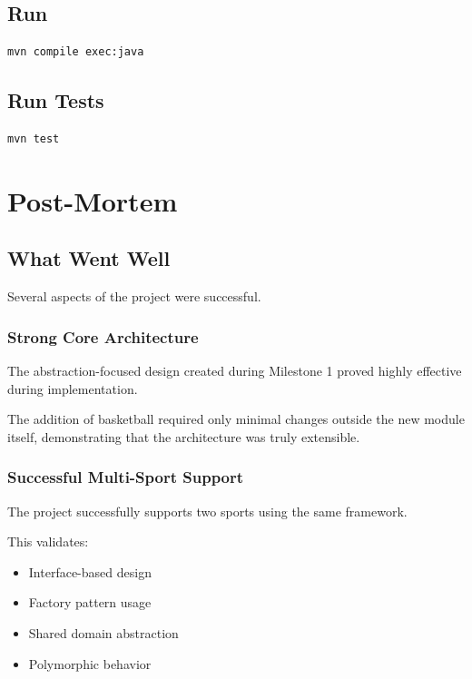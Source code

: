 \documentclass[11pt,a4paper]{article}
\begin{document}
\subsection*{Run}

\begin{verbatim}
mvn compile exec:java
\end{verbatim}

\subsection*{Run Tests}

\begin{verbatim}
mvn test
\end{verbatim}

\section{Post-Mortem}

\subsection{What Went Well}

Several aspects of the project were successful.

\subsubsection*{Strong Core Architecture}

The abstraction-focused design created during Milestone 1 proved highly effective during implementation.

The addition of basketball required only minimal changes outside the new module itself, demonstrating that the architecture was truly extensible.

\subsubsection*{Successful Multi-Sport Support}

The project successfully supports two sports using the same framework.

This validates:
\begin{itemize}
\item Interface-based design
\item Factory pattern usage
\item Shared domain abstraction
\item Polymorphic behavior
\end{itemize}
\end{document}
